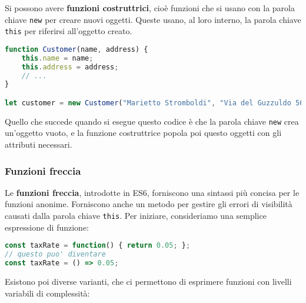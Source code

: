 \documentclass[a4paper,11pt]{article}
\begin{document}
Si possono avere \textbf{funzioni costruttrici}, cioè funzioni che si usano con la parola chiave \lstinline|new| per creare nuovi oggetti.
Queste usano, al loro interno, la parola chiave \lstinline|this| per riferirsi all'oggetto creato.

\begin{lstlisting}[language=javascript, style=codestyle]	
function Customer(name, address) {
	this.name = name;
	this.address = address;
	// ...
}

let customer = new Customer("Marietto Stromboldi", "Via del Guzzuldo 56");
\end{lstlisting}

Quello che succede quando si esegue questo codice è che la parola chiave \lstinline|new| crea un'oggetto vuoto, e la funzione costruttrice popola poi questo oggetti con gli attributi necessari.

\subsubsection{Funzioni freccia}
Le \textbf{funzioni freccia}, introdotte in ES6, forniscono una sintassi più concisa per le funzioni anonime.
Forniscono anche un metodo per gestire gli errori di visibilità causati dalla parola chiave \lstinline|this|.
Per iniziare, consideriamo una semplice espressione di funzione:
\begin{lstlisting}[language=javascript, style=codestyle]	
const taxRate = function() { return 0.05; };
// questo puo' diventare
const taxRate = () => 0.05;
\end{lstlisting}


Esistono poi diverse varianti, che ci permettono di esprimere funzioni con livelli variabili di complessità:
\end{document}
